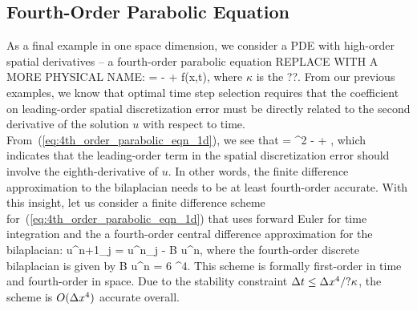 \documentclass[oneeqnum,onefignum,onetabnum,onethmnum]{siamltex}
\begin{document}
\subsection{Fourth-Order Parabolic Equation}
As a final example in one space dimension, we consider a PDE with high-order
spatial derivatives -- a fourth-order parabolic equation 
REPLACE WITH A MORE PHYSICAL NAME:
\beq
   = -\kappa {} + f(x,t),
  \label{eq:4th_order_parabolic_eqn_1d}
\eeq
where $\kappa$ is the ??.  From our previous examples, we know that 
optimal time step selection requires that the coefficient on leading-order 
spatial discretization error must be directly related to the second 
derivative of the solution $u$ with respect to time.  
From~(\ref{eq:4th_order_parabolic_eqn_1d}), we see that 
\beq
   = 
    \kappa^2  
  - \kappa {} 
  + 
  \label{eq:4th_order_parabolic_eqn_1d_second_time_derivative},
\eeq
which indicates that the leading-order term in the spatial discretization 
error should involve the eighth-derivative of $u$.  In other words, the
finite difference approximation to the bilaplacian needs to be at least 
fourth-order accurate.  With this insight, let us consider a finite 
difference scheme for~(\ref{eq:4th_order_parabolic_eqn_1d}) that 
uses forward Euler for time integration and the a fourth-order central 
difference approximation for the bilaplacian:
\bea
  u^{n+1}_j = u^{n}_j - \kappa \dt B u^n, 
  \label{eq:4th_order_parabolic_eqn_1d_FD_scheme}
\eea
where the fourth-order discrete bilaplacian is given by
\beq
  B u^n = 
               {6 \dx^4}.
\eeq
This scheme is formally first-order in time and fourth-order in space.  
Due to the stability constraint $\Delta t \le \Delta x^4/? \kappa$, the scheme is 
$O(\Delta x^4)$ accurate overall.
\end{document}
